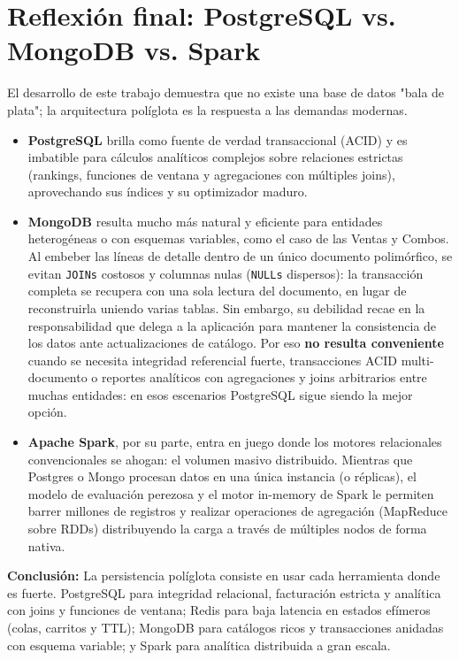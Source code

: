 \documentclass[11pt,a4paper]{article}
\begin{document}
\section{Reflexión final: PostgreSQL vs. MongoDB vs. Spark}

El desarrollo de este trabajo demuestra que no existe una base de datos "bala de plata"; la arquitectura políglota es la respuesta a las demandas modernas.

\begin{itemize}
    \item \textbf{PostgreSQL} brilla como fuente de verdad transaccional (ACID) y es imbatible para cálculos analíticos complejos sobre relaciones estrictas (rankings, funciones de ventana y agregaciones con múltiples joins), aprovechando sus índices y su optimizador maduro.
    \item \textbf{MongoDB} resulta mucho más natural y eficiente para entidades heterogéneas o con esquemas variables, como el caso de las Ventas y Combos. Al embeber las líneas de detalle dentro de un único documento polimórfico, se evitan \texttt{JOINs} costosos y columnas nulas (\texttt{NULLs} dispersos): la transacción completa se recupera con una sola lectura del documento, en lugar de reconstruirla uniendo varias tablas. Sin embargo, su debilidad recae en la responsabilidad que delega a la aplicación para mantener la consistencia de los datos ante actualizaciones de catálogo. Por eso \textbf{no resulta conveniente} cuando se necesita integridad referencial fuerte, transacciones ACID multi-documento o reportes analíticos con agregaciones y joins arbitrarios entre muchas entidades: en esos escenarios PostgreSQL sigue siendo la mejor opción.
    \item \textbf{Apache Spark}, por su parte, entra en juego donde los motores relacionales convencionales se ahogan: el volumen masivo distribuido. Mientras que Postgres o Mongo procesan datos en una única instancia (o réplicas), el modelo de evaluación perezosa y el motor in-memory de Spark le permiten barrer millones de registros y realizar operaciones de agregación (MapReduce sobre RDDs) distribuyendo la carga a través de múltiples nodos de forma nativa.
\end{itemize}

\textbf{Conclusión:} La persistencia políglota consiste en usar cada herramienta donde es fuerte. PostgreSQL para integridad relacional, facturación estricta y analítica con joins y funciones de ventana; Redis para baja latencia en estados efímeros (colas, carritos y TTL); MongoDB para catálogos ricos y transacciones anidadas con esquema variable; y Spark para analítica distribuida a gran escala.
\end{document}
